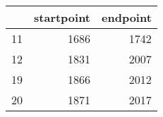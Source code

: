 % 
\begin{tabular}{rrr}
  \hline
 & startpoint & endpoint \\ 
  \hline
11 & 1686 & 1742 \\ 
  12 & 1831 & 2007 \\ 
  19 & 1866 & 2012 \\ 
  20 & 1871 & 2017 \\ 
   \hline
\end{tabular}
